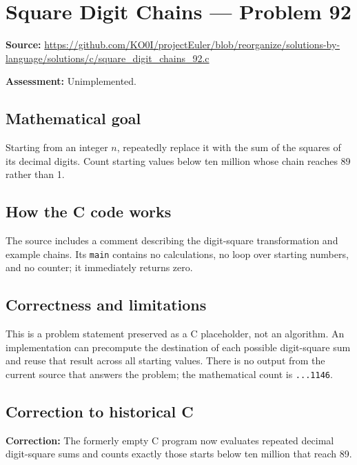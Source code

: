 \section{Square Digit Chains --- Problem 92}
\label{prob:92}
\noindent\textbf{Source:} \url{https://github.com/KO0I/projectEuler/blob/reorganize/solutions-by-language/solutions/c/square_digit_chains_92.c}

\noindent\textbf{Assessment:} Unimplemented.

\subsection*{Mathematical goal}
Starting from an integer \(n\), repeatedly replace it with the sum of the squares of its decimal digits. Count starting values below ten million whose chain reaches 89 rather than 1.

\subsection*{How the C code works}
The source includes a comment describing the digit-square transformation and example chains. Its \verb|main| contains no calculations, no loop over starting numbers, and no counter; it immediately returns zero.

\subsection*{Correctness and limitations}
This is a problem statement preserved as a C placeholder, not an algorithm. An implementation can precompute the destination of each possible digit-square sum and reuse that result across all starting values. There is no output from the current source that answers the problem; the mathematical count is \texttt{...1146}.


\subsection*{Correction to historical C}
{\color{red}\textbf{Correction:} The formerly empty C program now evaluates repeated decimal digit-square sums and counts exactly those starts below ten million that reach 89.}
